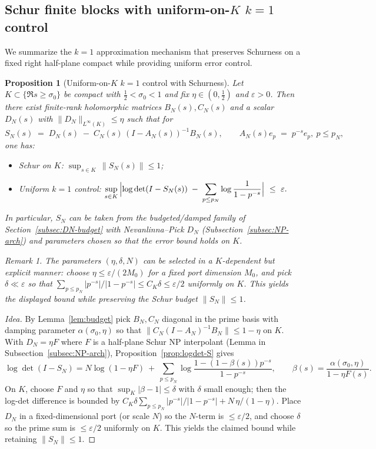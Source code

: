 \documentclass[11pt]{article}
\newtheorem{proposition}[theorem]{Proposition}
\theoremstyle{definition}
\theoremstyle{remark}
\newtheorem{remark}[theorem]{Remark}
\begin{document}
\subsection{Schur finite blocks with uniform-on-$K$ $k=1$ control}\label{subsec:K1-approx}
We summarize the $k=1$ approximation mechanism that preserves Schurness on a fixed right half-plane compact while providing uniform error control.

\begin{proposition}[Uniform-on-$K$ $k=1$ control with Schurness]\label{prop:K1-approx}
Let $K\subset\{\Re s\ge\sigma_0\}$ be compact with $\tfrac12<\sigma_0<1$ and fix $\eta\in(0,\tfrac12)$ and $\varepsilon>0$. Then there exist finite-rank holomorphic matrices $B_N(s),C_N(s)$ and a scalar $D_N(s)$ with $\|D_N\|_{L^{\infty}(K)}\le\eta$ such that for
\[
 S_N(s)\;=\;D_N(s)\; -\; C_N(s)\,(I-A_N(s))^{-1}B_N(s),\qquad A_N(s)e_p\;=\;p^{-s}e_p,\ p\le p_N,
\]
one has:
\begin{itemize}
 \item Schur on $K$: $\displaystyle\sup_{s\in K}\,\|S_N(s)\|\le 1$;
 \item Uniform $k=1$ control: $\displaystyle\sup_{s\in K}\,\Bigl|\log\det(I-S_N(s))\; -\;\sum_{p\le p_N}\log\frac{1}{1-p^{-s}}\Bigr|\ \le\ \varepsilon.$
\end{itemize}
In particular, $S_N$ can be taken from the budgeted/damped family of Section~\ref{subsec:DN-budget} with Nevanlinna--Pick $D_N$ (Subsection~\ref{subsec:NP-arch}) and parameters chosen so that the error bound holds on $K$.
\begin{remark}
The parameters $(\eta,\delta,N)$ can be selected in a $K$-dependent but explicit manner: choose $\eta\le \varepsilon/(2M_0)$ for a fixed port dimension $M_0$, and pick $\delta\ll \varepsilon$ so that $\sum_{p\le p_N} |p^{-s}|/|1-p^{-s}|\le C_K\delta\le \varepsilon/2$ uniformly on $K$. This yields the displayed bound while preserving the Schur budget $\|S_N\|\le 1$.
\end{remark}
\end{proposition}
\begin{proof}[Idea]
By Lemma~\ref{lem:budget} pick $B_N,C_N$ diagonal in the prime basis with damping parameter $\alpha(\sigma_0,\eta)$ so that $\|C_N(I-A_N)^{-1}B_N\|\le 1-\eta$ on $K$. With $D_N=\eta F$ where $F$ is a half-plane Schur NP interpolant (Lemma in Subsection~\ref{subsec:NP-arch}), Proposition~\ref{prop:logdet-S} gives
\[
 \log\det(I-S_N)=N\log(1-\eta F)\ +\ \sum_{p\le p_N}\log\frac{1-(1-\beta(s))p^{-s}}{1-p^{-s}},\qquad \beta(s)=\frac{\alpha(\sigma_0,\eta)}{1-\eta F(s)}.
\]
On $K$, choose $F$ and $\eta$ so that $\sup_K|\beta-1|\le\delta$ with $\delta$ small enough; then the log-det difference is bounded by $C_K\delta\sum_{p\le p_N}|p^{-s}|/|1-p^{-s}|+N\,\eta/(1-\eta)$. Place $D_N$ in a fixed-dimensional port (or scale $N$) so the $N$-term is $\le \varepsilon/2$, and choose $\delta$ so the prime sum is $\le\varepsilon/2$ uniformly on $K$. This yields the claimed bound while retaining $\|S_N\|\le 1$.
\end{proof}
\end{document}
